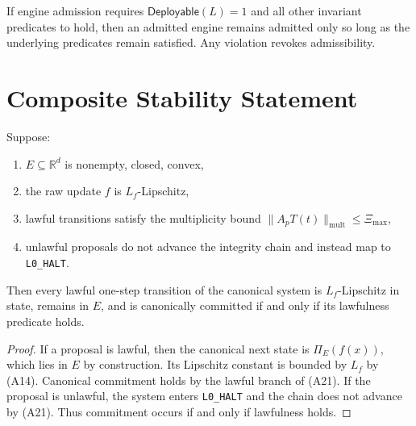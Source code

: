 \documentclass[11pt]{article}
\begin{document}
\begin{corollary}
If engine admission requires \(\mathsf{Deployable}(L)=1\) and all other invariant predicates to hold, then an admitted engine remains admitted only so long as the underlying predicates remain satisfied. Any violation revokes admissibility.
\end{corollary}

\section{Composite Stability Statement}
\begin{theorem}
Suppose:
\begin{enumerate}[leftmargin=1.2cm]
  \item \(E\subseteq\mathbb{R}^d\) is nonempty, closed, convex,
  \item the raw update \(f\) is \(L_f\)-Lipschitz,
  \item lawful transitions satisfy the multiplicity bound \(\|A_pT(t)\|_{\mathrm{mult}}\le \Xi_{\max}\),
  \item unlawful proposals do not advance the integrity chain and instead map to \texttt{L0\_HALT}.
\end{enumerate}
Then every lawful one-step transition of the canonical system is \(L_f\)-Lipschitz in state, remains in \(E\), and is canonically committed if and only if its lawfulness predicate holds.
\end{theorem}

\begin{proof}
If a proposal is lawful, then the canonical next state is \(\Pi_E(f(x))\), which lies in \(E\) by construction. Its Lipschitz constant is bounded by \(L_f\) by (A14). Canonical commitment holds by the lawful branch of (A21). If the proposal is unlawful, the system enters \texttt{L0\_HALT} and the chain does not advance by (A21). Thus commitment occurs if and only if lawfulness holds.
\end{proof}
\end{document}
